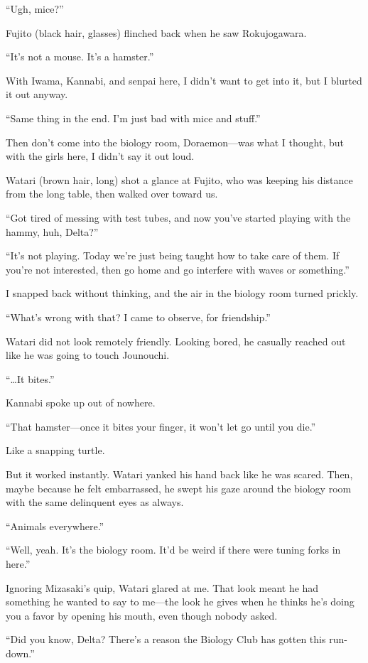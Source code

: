 \documentclass[
    a4paper,
    12pt,
    twoside,
    openany,
    UTF8,
    fontset=windows
]{ctexbook}
\begin{document}
``Ugh, mice?''

Fujito (black hair, glasses) flinched back when he saw Rokujogawara.

``It's not a mouse. It's a hamster.''

With Iwama, Kannabi, and senpai here, I didn't want to get into it, but I blurted it out anyway.

``Same thing in the end. I'm just bad with mice and stuff.''

Then don't come into the biology room, Doraemon---was what I thought, but with the girls here, I didn't say it out loud.

Watari (brown hair, long) shot a glance at Fujito, who was keeping his distance from the long table, then walked over toward us.

``Got tired of messing with test tubes, and now you've started playing with the hammy, huh, Delta?''

``It's not playing. Today we're just being taught how to take care of them. If you're not interested, then go home and go interfere with waves or something.''

I snapped back without thinking, and the air in the biology room turned prickly.

``What's wrong with that? I came to observe, for friendship.''

Watari did not look remotely friendly. Looking bored, he casually reached out like he was going to touch Jounouchi.

``\dots It bites.''

Kannabi spoke up out of nowhere.

``That hamster---once it bites your finger, it won't let go until you die.''

Like a snapping turtle.

But it worked instantly. Watari yanked his hand back like he was scared. Then, maybe because he felt embarrassed, he swept his gaze around the biology room with the same delinquent eyes as always.

``Animals everywhere.''

``Well, yeah. It's the biology room. It'd be weird if there were tuning forks in here.''

Ignoring Mizasaki's quip, Watari glared at me. That look meant he had something he wanted to say to me---the look he gives when he thinks he's doing you a favor by opening his mouth, even though nobody asked.

``Did you know, Delta? There's a reason the Biology Club has gotten this run-down.''
\end{document}
